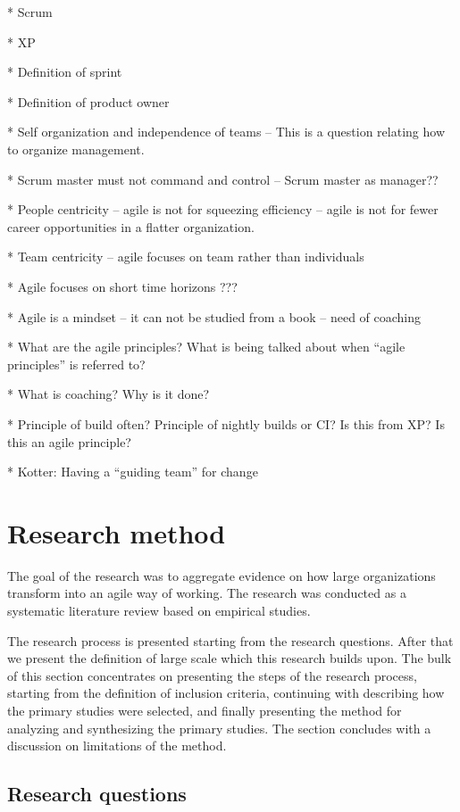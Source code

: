 \documentclass[preprint,authoryear,12pt]{elsarticle}
\begin{document}
* Scrum

* XP

* Definition of sprint

* Definition of product owner

* Self organization and independence of teams -- This is a question relating how
  to organize management. 

* Scrum master must not command and control -- Scrum master as manager??

* People centricity -- agile is not for squeezing efficiency -- agile is not for
  fewer career opportunities in a flatter organization.

* Team centricity -- agile focuses on team rather than individuals

* Agile focuses on short time horizons ???

* Agile is a mindset -- it can not be studied from a book -- need of coaching

* What are the agile principles? What is being talked about when ``agile
  principles'' is referred to?

* What is coaching? Why is it done?

* Principle of build often? Principle of nightly builds or CI? Is this from XP?
  Is this an agile principle?

* Kotter: Having a ``guiding team'' for change


\section{Research method}
\label{sec:method}

The goal of the research was to aggregate evidence on how large organizations
transform into an agile way of working. The research was conducted as a
systematic literature review based on empirical studies.

The research process is presented starting from the research questions. After
that we present the definition of large scale which this research builds upon.
The bulk of this section concentrates on presenting the steps of the research
process, starting from the definition of inclusion criteria, continuing with
describing how the primary studies were selected, and finally presenting the
method for analyzing and synthesizing the primary studies. The section concludes
with a discussion on limitations of the method.


\subsection{Research questions}
\end{document}
